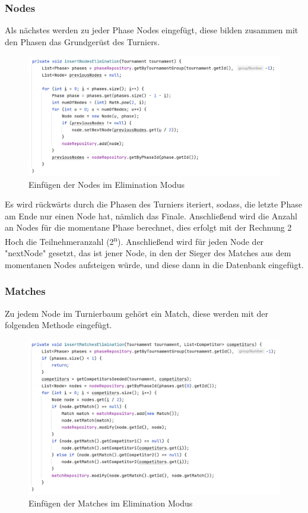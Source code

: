 \subsubsection{Nodes}

Als nächstes werden zu jeder Phase Nodes eingefügt, diese bilden zusammen mit den Phasen das Grundgerüst des Turniers. 

\begin{figure}[H]
    \includegraphics[scale=0.48]{pics/backend/elimination/elimination_insertNodes.png}
    \caption{Einfügen der Nodes im Elimination Modus}
\end{figure}

Es wird rückwärts durch die Phasen des Turniers iteriert, sodass, die letzte Phase am Ende nur einen Node hat, nämlich das Finale.
Anschließend wird die Anzahl an Nodes für die momentane Phase berechnet, dies erfolgt mit der Rechnung 2 Hoch die Teilnehmeranzahl (2\textsuperscript{n}). 
Anschließend wird für jeden Node der "nextNode" gesetzt, das ist jener Node, in den der Sieger des Matches aus dem momentanen Nodes aufsteigen würde, 
und diese dann in die Datenbank eingefügt.

\subsubsection{Matches}

Zu jedem Node im Turnierbaum gehört ein Match, diese werden mit der folgenden Methode eingefügt.

\begin{figure}[H]
    \includegraphics[scale=0.48]{pics/backend/elimination/elimination_insertMatches.png}
    \caption{Einfügen der Matches im Elimination Modus}
\end{figure}


